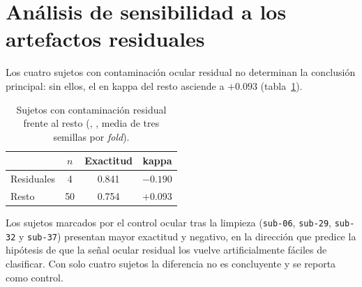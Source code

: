 \section{Análisis de sensibilidad a los artefactos residuales}
\label{sec:sensibilidad}

Los cuatro sujetos con contaminación ocular residual no determinan la conclusión principal: sin
ellos, el \dsi{} en kappa del resto asciende a $+0.093$ (tabla~\ref{tab:sensibilidad}).

\begin{table}[H]
\centering
\caption{Sujetos con contaminación residual frente al resto (\eegnet{}, \loso{}, media de tres semillas por \textit{fold}).}
\label{tab:sensibilidad}
\begin{tabular}{lccc}
\toprule
 & \textbf{$n$} & \textbf{Exactitud \loso{}} & \textbf{\dsi{} kappa} \\
\midrule
Residuales & 4  & 0.841 & $-0.190$ \\
Resto      & 50 & 0.754 & $+0.093$ \\
\bottomrule
\end{tabular}
\end{table}

Los sujetos marcados por el control ocular tras la limpieza (\texttt{sub-06}, \texttt{sub-29},
\texttt{sub-32} y \texttt{sub-37}) presentan mayor exactitud y \dsi{} negativo, en la dirección que
predice la hipótesis de que la señal ocular residual los vuelve artificialmente fáciles de clasificar.
Con solo cuatro sujetos la diferencia no es concluyente y se reporta como control.

